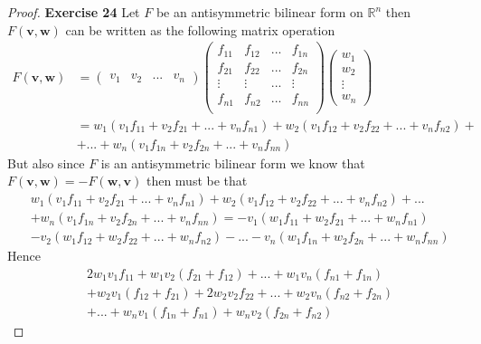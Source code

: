 \documentclass[11pt]{article}
\newcommand{\R}{\mathbb{R}}
\theoremstyle{definition}
\begin{document}
\begin{proof}{\textbf{Exercise 24}}
    Let $F$ be an antisymmetric bilinear form on $\R^n$ then
    $F(\bm{v}, \bm{w})$ can be written as the following matrix operation
    \begin{align*}
        F(\bm{v}, \bm{w})
        &= \begin{pmatrix} v_1 & v_2 & ... & v_n\end{pmatrix}
        \begin{pmatrix}
            f_{11} & f_{12} & ... & f_{1n}\\
            f_{21} & f_{22} & ... & f_{2n}\\
            \vdots & \vdots & ... & \vdots\\
            f_{n1} & f_{n2} & ... & f_{nn}\\
        \end{pmatrix}
        \begin{pmatrix} w_1 \\ w_2 \\ \vdots \\ w_n\end{pmatrix}\\
        &= w_1(v_1 f_{11} + v_2 f_{21} + ... + v_n f_{n1}) +
        w_2(v_1 f_{12} + v_2 f_{22} + ... + v_n f_{n2}) +\\
        \quad& + ... + w_n(v_1 f_{1n} + v_2 f_{2n} + ... + v_n f_{nn})
    \end{align*}
    But also since $F$ is an antisymmetric bilinear form we know that\\
    $F(\bm{v}, \bm{w}) = - F(\bm{w}, \bm{v})$ then must be that
    \begin{align*}
        &w_1(v_1 f_{11} + v_2 f_{21} + ... + v_n f_{n1})
        + w_2(v_1 f_{12} + v_2 f_{22} + ... + v_n f_{n2}) + ...\\
        &+ w_n(v_1 f_{1n} + v_2 f_{2n} + ... + v_n f_{nn})
        = -v_1(w_1 f_{11} + w_2 f_{21} + ... + w_n f_{n1})\\
        &-v_2(w_1 f_{12} + w_2 f_{22} + ... + w_n f_{n2})
        - ... - v_n(w_1 f_{1n} + w_2 f_{2n} + ... + w_n f_{nn})
    \end{align*}
    Hence
    \begin{align*}
        &2w_1v_1 f_{11} + w_1v_2(f_{21} + f_{12}) + ... + w_1v_n(f_{n1} + f_{1n})\\
        &+ w_2v_1(f_{12} + f_{21}) + 2w_2v_2f_{22} + ... + w_2v_n(f_{n2} + f_{2n})\\
        &+ ... + w_nv_1(f_{1n} + f_{n1}) + w_nv_2(f_{2n} + f_{n2})

\end{align*}
\end{proof}
\end{document}
